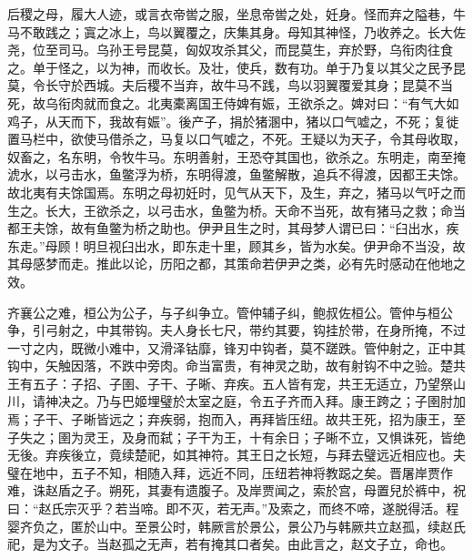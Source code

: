 \documentclass[]{article}
\begin{document}
后稷之母，履大人迹，或言衣帝喾之服，坐息帝喾之处，妊身。怪而弃之隘巷，牛马不敢践之；寘之冰上，鸟以翼覆之，庆集其身。母知其神怪，乃收养之。长大佐尧，位至司马。乌孙王号昆莫，匈奴攻杀其父，而昆莫生，弃於野，乌衔肉往食之。单于怪之，以为神，而收长。及壮，使兵，数有功。单于乃复以其父之民予昆莫，令长守於西城。夫后稷不当弃，故牛马不践，鸟以羽翼覆爱其身；昆莫不当死，故乌衔肉就而食之。北夷橐离国王侍婢有娠，王欲杀之。婢对曰：``有气大如鸡子，从天而下，我故有娠''。後产子，捐於猪溷中，猪以口气嘘之，不死；复徙置马栏中，欲使马借杀之，马复以口气嘘之，不死。王疑以为天子，令其母收取，奴畜之，名东明，令牧牛马。东明善射，王恐夺其国也，欲杀之。东明走，南至掩淲水，以弓击水，鱼鳖浮为桥，东明得渡，鱼鳖解散，追兵不得渡，因都王夫馀。故北夷有夫馀国焉。东明之母初妊时，见气从天下，及生，弃之，猪马以气吁之而生之。长大，王欲杀之，以弓击水，鱼鳖为桥。天命不当死，故有猪马之救；命当都王夫馀，故有鱼鳖为桥之助也。伊尹且生之时，其母梦人谓已曰：``臼出水，疾东走。''母顾！明旦视臼出水，即东走十里，顾其乡，皆为水矣。伊尹命不当没，故其母感梦而走。推此以论，历阳之都，其策命若伊尹之类，必有先时感动在他地之效。

齐襄公之难，桓公为公子，与子纠争立。管仲辅子纠，鲍叔佐桓公。管仲与桓公争，引弓射之，中其带钩。夫人身长七尺，带约其要，钩挂於带，在身所掩，不过一寸之内，既微小难中，又滑泽钴靡，锋刃中钩者，莫不蹉跌。管仲射之，正中其钩中，矢触因落，不跌中旁肉。命当富贵，有神灵之助，故有射钩不中之验。楚共王有五子：子招、子圉、子干、子晰、弃疾。五人皆有宠，共王无适立，乃望祭山川，请神决之。乃与巴姬埋璧於太室之庭，令五子齐而入拜。康王跨之；子圉肘加焉；子干、子晰皆远之；弃疾弱，抱而入，再拜皆压纽。故共王死，招为康王，至子失之；圉为灵王，及身而弑；子干为王，十有余日；子晰不立，又惧诛死，皆绝无後。弃疾後立，竟续楚祀，如其神符。其王日之长短，与拜去璧远近相应也。夫璧在地中，五子不知，相随入拜，远近不同，压纽若神将教跽之矣。晋屠岸贾作难，诛赵盾之子。朔死，其妻有遗腹子。及岸贾闻之，索於宫，母置兒於裤中，祝曰：``赵氏宗灭乎？若当啼。即不灭，若无声。''及索之，而终不啼，遂脱得活。程婴齐负之，匿於山中。至景公时，韩厥言於景公，景公乃与韩厥共立赵孤，续赵氏祀，是为文子。当赵孤之无声，若有掩其口者矣。由此言之，赵文子立，命也。
\end{document}
